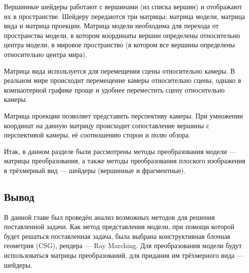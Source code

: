 Вершинные  шейдеры  работают  с  вершинами  (из  списка  вершин)  и 
отображают  их  в  пространстве.
Шейдеру  передаются  три  матрицы:  матрица модели, матрица вида и матрица проекции.
Матрица  модели  необходима  для  перехода  от  пространства  модели,  в 
котором  координаты  вершин  определены  относительно  центра  модели,  в 
мировое пространство (в котором все вершины определены относительно центра 
мира).

Матрица вида используется для перемещения сцены относительно камеры.
В реальном мире происходит перемещение камеры относительно сцены, однако 
в  компьютерной  графике  проще  и  удобнее  переместить  сцену 
относительно камеры.

Матрица  проекции  позволяет  представить  перспективу  камеры.
При умножении координат на данную матрицу происходит сопоставление вершины с перспективой камеры, её соотношению сторон и полю обзора.




Итак, в данном разделе были рассмотрены методы преобразования модели 
--- матрицы  преобразования,  а  также  методы  преобразования  плоского 
изображения в трёхмерный вид --- шейдеры (вершинные и фрагментные). 

\subsection*{Вывод}
В  данной  главе  был  проведён  анализ  возможных  методов  для  решения 
поставленной задачи.
Как метод представления  модели, при помощи которой будет 
решаться поставленная задача,  была  выбрана  конструктивная  блочная геометрия  (CSG), 
рендера  ---  Ray Marching.
Для  преобразования  модели  будут  использоваться 
матрицы преобразований, для придания им трёхмерного вида --- шейдеры.
